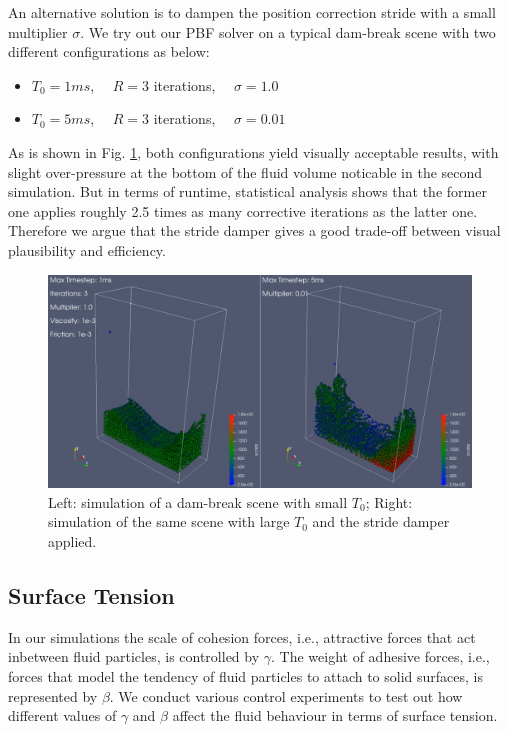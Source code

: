 \documentclass[
	11pt, 
	DIV10,
	ngerman,
	a4paper, 
	oneside, 
	headings=normal, 
	captions=tableheading,
	final, 
	numbers=noenddot
]{scrartcl}
\begin{document}
An alternative solution is to dampen the position correction stride with a small multiplier $ \sigma $. We try out our PBF solver on a typical dam-break scene with two different configurations as below:

\begin{itemize}
    \item $ T_{0} = 1ms $, $ \quad R = 3 $ iterations, $ \quad \sigma = 1.0 $
    \item $ T_{0} = 5ms $, $ \quad R = 3 $ iterations, $ \quad \sigma = 0.01 $
\end{itemize}

As is shown in Fig. \ref{fig:strideDamper}, both configurations yield visually acceptable results, with slight over-pressure at the bottom of the fluid volume noticable in the second simulation. But in terms of runtime, statistical analysis shows that the former one applies roughly 2.5 times as many corrective iterations as the latter one. Therefore we argue that the stride damper gives a good trade-off between visual plausibility and efficiency.

\begin{figure}[h]
    \centering
    \includegraphics[width=.6\textwidth]{pics/pbf_stride_damper.png}
    \caption{Left: simulation of a dam-break scene with small $ T_{0} $; Right: simulation of the same scene with large $ T_{0} $ and the stride damper applied.}
    \label{fig:strideDamper}
\end{figure}

\subsection{Surface Tension}

In our simulations the scale of cohesion forces, i.e., attractive forces that act inbetween fluid particles, is controlled by $ \gamma $. The weight of adhesive forces, i.e., forces that model the tendency of fluid particles to attach to solid surfaces, is represented by $ \beta $. We conduct various control experiments to test out how different values of $ \gamma $ and $ \beta $ affect the fluid behaviour in terms of surface tension.
\end{document}
